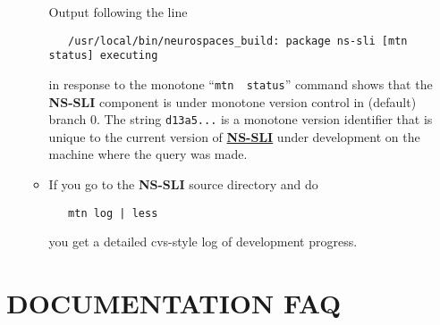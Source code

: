 \documentclass[12pt]{article}
\begin{document}
\begin{enumerate}
\begin{itemize}
Output following the line
\begin{verbatim}
   /usr/local/bin/neurospaces_build: package ns-sli [mtn status] executing
\end{verbatim}
in response to the monotone ``{\tt mtn\,\,status}'' command shows that the {\bf NS-SLI} component is under monotone version control in (default) branch 0. The string {\tt d13a5...} is a monotone version identifier that is
unique to the current version of \href{../nssli/nssli.tex}{\bf NS-SLI}
under development on the machine where the query was made.

\item If you go to the {\bf NS-SLI} source directory and do
\begin{verbatim}
   mtn log | less
\end{verbatim}
you get a detailed cvs-style log of development progress.

\end{itemize}
\end{enumerate}

\section*{DOCUMENTATION FAQ}
\end{document}
